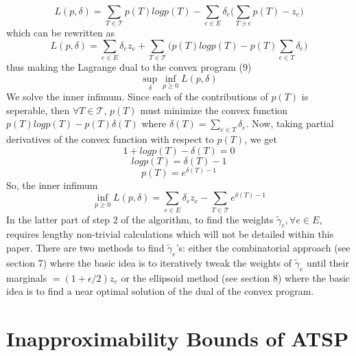 \documentclass[oneside]{projectpaper} %
\begin{document}
\begin{equation*}
L(p,\delta) = \sum\limits_{T \in \mathcal{T}}p(T)logp(T) - \sum\limits_{e \in E}\delta_e\bigg(\sum\limits_{T \ni e}p(T) - z_e\bigg) 
\end{equation*}
which can be rewritten as
\begin{equation*}
L(p,\delta) = \sum\limits_{e \in E}\delta_ez_e + \sum\limits_{T \in \mathcal{T}}\bigg(p(T)logp(T)  - p(T) \sum\limits_{e \in T}\delta_e\bigg)
\end{equation*}
thus making the Lagrange dual to the convex program (9)
\begin{equation}
\sup_{\delta}\inf_{p \geq 0}L(p,\delta)
\end{equation}
We solve the inner infimum. Since each of the contributions of $p(T)$ is seperable, then $\forall T \in \mathcal{T}$, $p(T)$ must minimize the convex function $p(T)logp(T) - p(T)\delta(T)$ where $\delta(T) = \sum\limits_{e \in T}\delta_e$. Now, taking partial derivatives of the convex function with respect to $p(T)$, we get
\begin{equation*}
1 + logp(T) - \delta(T) = 0
\end{equation*}
\begin{equation*}
logp(T) = \delta(T) - 1
\end{equation*}
\begin{equation}
p(T) = e^{\delta(T) - 1}
\end{equation}
So, the inner infimum
\begin{equation*}
\inf_{p \geq 0}L(p,\delta) = \sum\limits_{e \in E}\delta_ez_e - \sum\limits_{T \in \mathcal{T}}e^{\delta(T) - 1}
\end{equation*}
In the latter part of step 2 of the algorithm, to find the weights $\tilde{\gamma}_{e}, \forall e \in E$, requires lengthy non-trivial calculations which will not be detailed within this paper. There are two methods to find $\tilde{\gamma}_{e}$'s: either the combinatorial approach (see \cite{AGM10} section 7) where the basic idea is to iteratively tweak the weights of $\tilde{\gamma}_{e}$ until their marginals $= (1 + \epsilon/2)z_e$ or the ellipsoid method (see \cite{AGM10} section 8) where the basic idea is to find a near optimal solution of the dual of the convex program.

\section{Inapproximability Bounds of ATSP}
\end{document}
